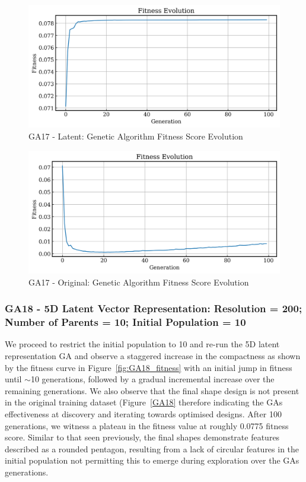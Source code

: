 \documentclass{article}
\begin{document}
\begin{figure}[H]
    \centering
    \includegraphics[width=0.75\linewidth]{figures/GAResults/GA17/latent/100gen_fitness.png}
    \caption{GA17 - Latent: Genetic Algorithm Fitness Score Evolution}
    \label{fig:GA17_latent_fitness}
\end{figure}
\begin{figure}[H]
    \centering
    \includegraphics[width=0.75\linewidth]{figures/GAResults/GA17/original/original_fitness.png}
    \caption{GA17 - Original: Genetic Algorithm Fitness Score Evolution}
    \label{fig:GA17_original_fitness}
\end{figure}

\subsubsection*{GA18 - 5D Latent Vector Representation: Resolution = 200; Number of Parents = 10; Initial Population = 10}
We proceed to restrict the initial population to 10 and re-run the 5D latent representation GA and observe a staggered increase in the compactness as shown by the fitness curve in Figure~\ref{fig:GA18_fitness} with an initial jump in fitness until $\sim$10 generations, followed by a gradual incremental increase over the remaining generations. We also observe that the final shape design is not present in the original training dataset (Figure~\ref{GA18} therefore indicating the GAs effectiveness at discovery and iterating towards optimised designs. After 100 generations, we witness a plateau in the fitness value at roughly 0.0775 fitness score. Similar to that seen previously, the final shapes demonstrate features described as a rounded pentagon, resulting from a lack of circular features in the initial population not permitting this to emerge during exploration over the GAs generations.
\end{document}
